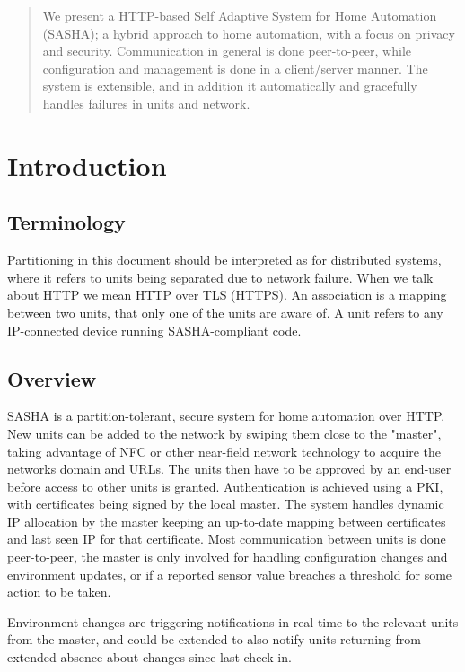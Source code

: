 \begin{abstract}

We present a HTTP-based Self Adaptive System for Home Automation (SASHA); a hybrid approach to home automation, with a focus on privacy and security. Communication in general is done peer-to-peer, while configuration and management is done in a client/server manner. The system is extensible, and in addition it automatically and gracefully handles failures in units and network.

\end{abstract}


\section{Introduction}

\subsection{Terminology}
Partitioning in this document should be interpreted as for distributed systems, where it refers to units being separated due to network failure. When we talk about HTTP we mean HTTP over TLS (HTTPS). An association is a mapping between two units, that only one of the units are aware of. A unit refers to any IP-connected device running SASHA-compliant code.

\subsection{Overview}
SASHA is a partition-tolerant, secure system for home automation over HTTP. New units can be added to the network by swiping them close to the "master", taking advantage of NFC or other near-field network technology to acquire the networks domain and URLs. The units then have to be approved by an end-user before access to other units is granted. Authentication is achieved using a PKI, with certificates being signed by the local master. The system handles dynamic IP allocation by the master keeping an up-to-date mapping between certificates and last seen IP for that certificate. Most communication between units is done peer-to-peer, the master is only involved for handling configuration changes and environment updates, or if a reported sensor value breaches a threshold for some action to be taken.

Environment changes are triggering notifications in real-time to the relevant units from the master, and could be extended to also notify units returning from extended absence about changes since last check-in.


